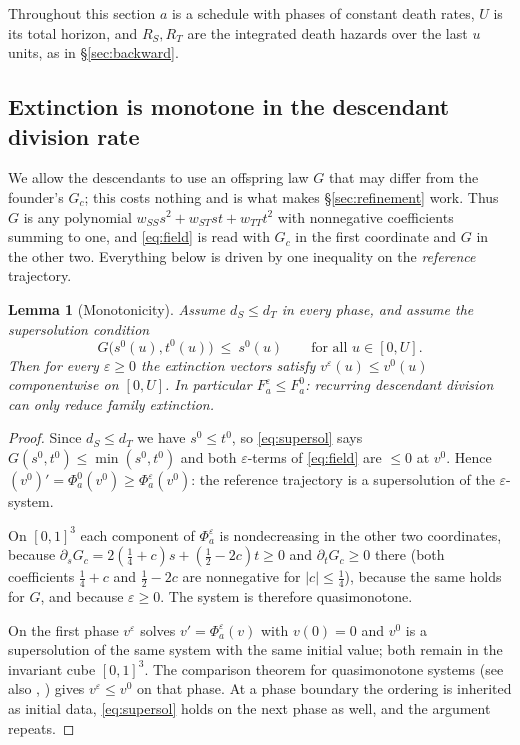 \documentclass[11pt]{article}
\theoremstyle{plain}
\newtheorem{lemma}[theorem]{Lemma}
\theoremstyle{definition}
\theoremstyle{remark}
\newcommand{\eps}{\varepsilon}
\begin{document}
Throughout this section $a$ is a schedule with phases of constant death rates,
$U$ is its total horizon, and $R_S,R_T$ are the integrated death hazards over
the last $u$ units, as in \S\ref{sec:backward}.

\subsection{Extinction is monotone in the descendant division rate}

We allow the descendants to use an offspring law $G$ that may differ from the
founder's $G_c$; this costs nothing and is what makes \S\ref{sec:refinement}
work. Thus $G$ is any polynomial $w_{SS}s^2+w_{ST}st+w_{TT}t^2$ with
nonnegative coefficients summing to one, and \eqref{eq:field} is read with
$G_c$ in the first coordinate and $G$ in the other two. Everything below is
driven by one inequality on the \emph{reference} trajectory.

\begin{lemma}[Monotonicity]\label{lem:mono}
Assume $d_S\le d_T$ in every phase, and assume the supersolution condition
\begin{equation}\label{eq:supersol}
 G\bigl(s^0(u),t^0(u)\bigr)\ \le\ s^0(u)\qquad\text{for all }u\in[0,U].
\end{equation}
Then for every $\eps\ge0$ the extinction vectors satisfy
$v^{\eps}(u)\le v^{0}(u)$ componentwise on $[0,U]$. In particular
$F^{\eps}_a\le F^{0}_a$: recurring descendant division can only \emph{reduce}
family extinction.
\end{lemma}

\begin{proof}
Since $d_S\le d_T$ we have $s^0\le t^0$, so \eqref{eq:supersol} says
$G(s^0,t^0)\le\min(s^0,t^0)$ and both $\eps$-terms of \eqref{eq:field} are
$\le0$ at $v^0$. Hence $(v^0)'=\Phi^0_a(v^0)\ge\Phi^{\eps}_a(v^0)$: the
reference trajectory is a supersolution of the $\eps$-system.

On $[0,1]^3$ each component of $\Phi^{\eps}_a$ is nondecreasing in the other
two coordinates, because $\partial_sG_c=2(\tfrac14+c)s+(\tfrac12-2c)t\ge0$ and
$\partial_tG_c\ge0$ there (both coefficients $\tfrac14+c$ and $\tfrac12-2c$ are
nonnegative for $|c|\le\tfrac14$), because the same holds for $G$, and because
$\eps\ge0$. The system is therefore quasimonotone.

On the first phase $v^{\eps}$ solves $v'=\Phi^{\eps}_a(v)$ with $v(0)=0$ and
$v^0$ is a supersolution of the same system with the same initial value; both
remain in the invariant cube $[0,1]^3$. The comparison theorem for
quasimonotone systems \citep[\S10]{Walter1970} (see also
\citep[Ch.~3]{Smith1995}, \citep[\S{}III.12]{Walter1998}) gives
$v^{\eps}\le v^0$ on that phase. At a phase boundary the ordering is inherited
as initial data, \eqref{eq:supersol} holds on the next phase as well, and the
argument repeats.
\end{proof}
\end{document}
